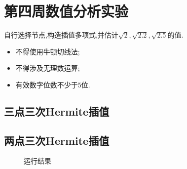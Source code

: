 \section{第四周数值分析实验}
\begin{ex}
	自行选择节点,构造插值多项式,并估计$\sqrt{2},\sqrt{2.2},\sqrt{2.5}$的值.
	\begin{itemize}
		\item 不得使用牛顿切线法;
		\item 不得涉及无理数运算;
		\item 有效数字位数不少于$5$位.
	\end{itemize}
\end{ex}
\subsection{三点三次Hermite插值}

\qa [1.4142, 1.4832, 1.5811]
\subsection{两点三次Hermite插值}

\qa [1.4142, 1.4833, 1.5811]
\begin{figure}[H]
	\centering
	\hfill
	\caption{运行结果}
	\label{fig:day4}
\end{figure}

